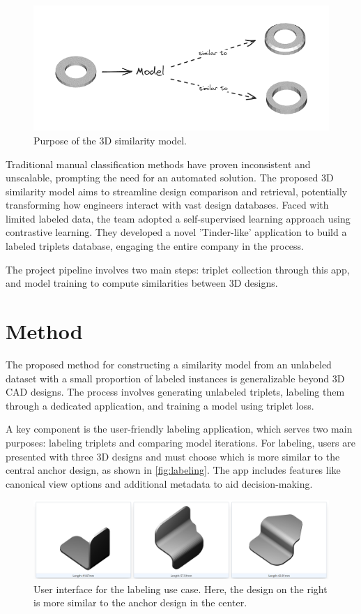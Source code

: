 \documentclass{article}
\begin{document}
\begin{figure}[h]
    \centering
    \includegraphics[width=0.8\columnwidth]{assets/similar-pieces.png}
    \caption{Purpose of the 3D similarity model.}
    \label{fig:purpose}
\end{figure}
Traditional manual classification methods have proven inconsistent and unscalable, prompting the need for an automated solution. The proposed 3D similarity model aims to streamline design comparison and retrieval, potentially transforming how engineers interact with vast design databases.
Faced with limited labeled data, the team adopted a self-supervised learning approach using contrastive learning. They developed a novel 'Tinder-like' application to build a labeled triplets database, engaging the entire company in the process. 

The project pipeline involves two main steps: triplet collection through this app, and model training to compute similarities between 3D designs.

\section{Method}

The proposed method for constructing a similarity model from an unlabeled dataset with a small proportion of labeled instances is generalizable beyond 3D CAD designs. The process involves generating unlabeled triplets, labeling them through a dedicated application, and training a model using triplet loss.

A key component is the user-friendly labeling application, which serves two main purposes: labeling triplets and comparing model iterations. For labeling, users are presented with three 3D designs and must choose which is more similar to the central anchor design, as shown in \autoref{fig:labeling}. The app includes features like canonical view options and additional metadata to aid decision-making.

\begin{figure}[h]
    \centering
    \includegraphics[width=\columnwidth]{assets/tinder3d_labeling.png}
    \caption{User interface for the labeling use case. Here, the design on the right is more similar to the anchor design in the center.}
    \label{fig:labeling}
\end{figure}
\end{document}

